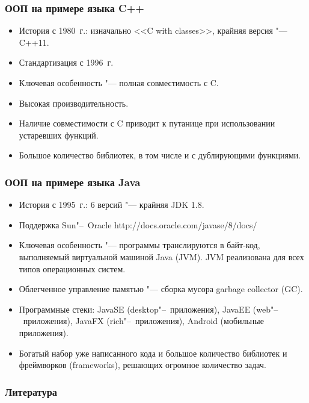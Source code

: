 \documentclass[default]{beamer}
\begin{document}
	\begin{frame}
	\frametitle{ООП на примере языка C++}
	
	\begin{itemize}
	\item История с 1980~г.: изначально <<C with classes>>, крайняя версия "---
	C++11.
	\item Стандартизация с 1996~г. 
	\item Ключевая особенность "--- полная совместимость с C.
	\item Высокая производительность.
	\item Наличие совместимости с C приводит к путанице при использовании
	устаревших функций.
	\item Большое количество библиотек, в том числе и с дублирующими функциями.
	\end{itemize}		
	
	\end{frame}
	
	\begin{frame}
	\frametitle{ООП на примере языка Java}
	
	\begin{itemize}
	\item История с 1995~г.: 6 версий "--- крайняя JDK 1.8.
	\item Поддержка Sun"--~Oracle http://docs.oracle.com/javase/8/docs/
	\item Ключевая особенность "--- программы транслируются в байт-код,
	выполняемый виртуальной машиной Java (JVM). JVM реализована для всех типов
	операционных систем.
	\item Облегченное управление памятью "--- сборка мусора garbage collector
	(GC).
	\item Программные стеки: JavaSE (desktop"--~приложения), JavaEE
	(web"--~приложения), JavaFX (rich"--~приложения), Android (мобильные
	приложения).
	\item Богатый набор уже написанного кода и большое количество библиотек и
	фреймворков (frameworks), решающих огромное количество задач.
	\end{itemize}
	\end{frame}
	
	\begin{frame}
	\frametitle{Литература}
	
	
	\nocite{*}
	
	\end{frame}
	
\end{document}

